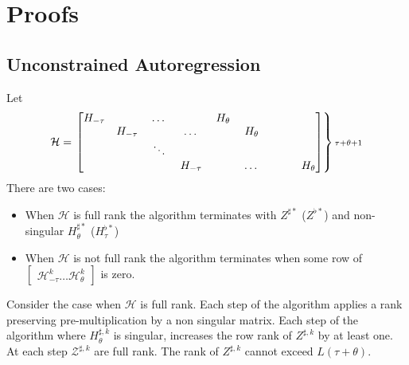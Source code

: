 \documentclass{elsart}
\begin{document}

%

\clearpage
\newpage




\appendix

\section{Proofs}
\label{sec:proofs}


\subsection{Unconstrained Autoregression}
\label{sec:uarproof}

{%
\begin{thrm}
Let 
{\small
\begin{gather} \mathcal{H}=\left .
  \begin{bmatrix}
H_{-\tau}&\hspace{0.25in}&\dots&\hspace{0.25in}&H_{\theta}\\
&H_{-\tau}&\hspace{0.25in}&\dots&\hspace{0.25in}&H_{\theta}\\
&&\ddots\\
&&&H_{-\tau}&\hspace{0.25in}&\dots&\hspace{0.25in}&H_{\theta}\\
  \end{bmatrix} \right \} \text{${\scriptstyle\tau+\theta+1}$} 
\end{gather}}
There are two cases:
\begin{itemize}
\item When $\mathcal{H}$ is full rank the algorithm terminates with 
 $Z^{\sharp\ast}$ ($Z^{\flat\ast}$) and non-singular
 $H^{\sharp\ast}_{\theta}$ ($H^{\flat\ast}_{\tau}$)
\item When $\mathcal{H}$ is not full rank the algorithm terminates when
some row of $
\begin{bmatrix}
\mathcal{H}^k_{-\tau}\ldots\mathcal{H}^k_\theta 
\end{bmatrix}$ is zero.
\end{itemize}

\end{thrm}
}
\begin{prf}
Consider the case when $\mathcal{H}$ is full rank.
  Each step of the algorithm applies a  rank preserving
pre-multiplication by a non singular matrix. Each step of the algorithm
where $H^{\sharp,k}_\theta$ is singular, increases the row rank of
$Z^{\sharp,k}$ by at least one.  At each step $\mathcal{Z}^{\sharp,k}$ are full rank. The rank of $Z^{\sharp,k}$ cannot exceed $L (\tau + \theta)$.
\end{prf}
\end{document}
